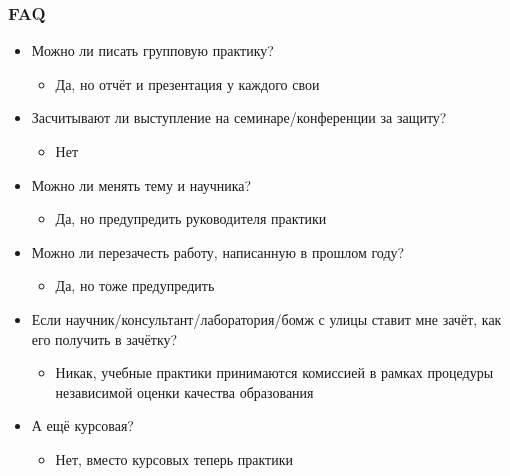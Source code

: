 \documentclass{../../slides-style}
\begin{document}
    \begin{frame}
        \frametitle{FAQ}
        \begin{small}
            \begin{itemize}
                \item Можно ли писать групповую практику?
                \begin{itemize}
                    \item Да, но отчёт и презентация у каждого свои
                \end{itemize}
                \item Засчитывают ли выступление на семинаре/конференции за защиту?
                \begin{itemize}
                    \item Нет
                \end{itemize}
                \item Можно ли менять тему и научника?
                \begin{itemize}
                    \item Да, но предупредить руководителя практики
                \end{itemize}
                \item Можно ли перезачесть работу, написанную в прошлом году?
                \begin{itemize}
                    \item Да, но тоже предупредить
                \end{itemize}
                \item Если научник/консультант/лаборатория/бомж с улицы ставит мне зачёт, как его получить в зачётку?
                \begin{itemize}
                    \item Никак, учебные практики принимаются комиссией в рамках процедуры независимой оценки качества образования
                \end{itemize}
                \item А ещё курсовая?
                \begin{itemize}
                    \item Нет, вместо курсовых теперь практики
                \end{itemize}
            \end{itemize}
        \end{small}
    \end{frame}
\end{document}
